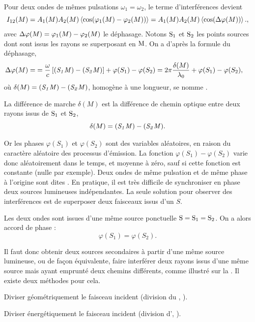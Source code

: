 \documentclass[12pt,fancy]{cours}
\begin{document}
 Pour deux ondes de mêmes pulsations $\omega_1=\omega_2$, le terme d'interférences devient
 \begin{equation}
I_{12}(M) = A_1(M) A_2(M)\left\langle {\cos(\varphi_1(M)-\varphi_2(M))} \right\rangle = A_1(M) A_2(M)\left\langle {\cos(\Delta\varphi(M))} \right\rangle.,
\end{equation}
avec $ \Delta \varphi(M)  = \varphi_1(M)-\varphi_2(M)$ le déphasage.
Notons $\rm S_1$ et $\rm S_2$ les points sources dont sont issus les rayons se superposant en $\rm M$. On a d'après la formule du déphasage,
\begin{equation}
\begin{split}
  \Delta \varphi(M) = 
&=\frac{\omega}{c}\left[\mathit{(S_1M)}-\mathit{(S_2M)}\right]+\varphi(S_1)-\varphi(S_2)
=2\pi \frac{\delta(M)}{\lambda_0}+\varphi(S_1)-\varphi(S_2),
\end{split}
\end{equation}
où $\delta(M)=\mathit{(S_1M)}-\mathit{(S_2M)}$, homogène à une longueur, se nomme .
\begin{definition}\label{def:}
La différence de marche $\delta(M)$ est la différence de chemin optique entre deux rayons issus de $\rm S_1$ et $\rm S_2$,
$$
\delta(M)=\mathit{(S_1M)}-\mathit{(S_2M)}.
$$
\end{definition}
Or les phases $\varphi(S_1)$ et $\varphi(S_2)$ sont des variables aléatoires, en raison du caractère aléatoire des processus d'émission. La fonction $\varphi(S_1)-\varphi(S_2)$ varie donc aléatoirement dans le temps, et moyenne à zéro, sauf si cette fonction est constante (nulle par exemple). Deux ondes de même pulsation et de même phase à l'origine sont dites . En pratique, il est très difficile de synchroniser en phase deux sources lumineuses indépendantes. La seule solution pour observer des interférences est de superposer deux faisceaux issus d'un  $S$.
\begin{prop}\label{prop:phase}
Les deux ondes sont issues d'une même source ponctuelle $\rm S =\rm S_1 = \rm S_2$. On a alors accord de phase :
$$\varphi(S_1)=\varphi(S_2).$$
\end{prop}
Il faut donc obtenir deux sources secondaires à partir d'une même source lumineuse, ou de façon équivalente, faire interférer deux rayons issus d'une même source mais ayant emprunté deux chemins différents, comme illustré sur la . Il existe deux méthodes pour cela.
\begin{liste}
\item Diviser géométriquement le faisceau incident (division du , ).
\item Diviser énergétiquement le faisceau incident (division d', ).

\end{liste}
\end{document}
